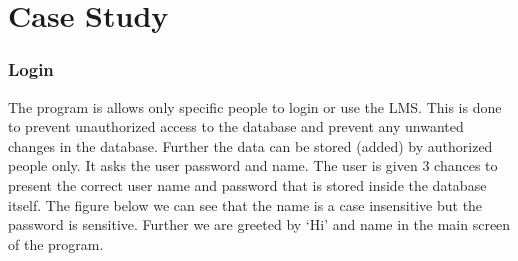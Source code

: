 \documentclass[12pt, a4paper, titlepage, openany]{report}
\begin{document}
\part{Case Study}
\section{Login}
The program is allows only specific people to login or use the LMS. This is done to prevent unauthorized access to the database and prevent any unwanted changes in the database. Further the data can be stored (added) by authorized people only. It asks the user password and name. The user is given 3 chances to present the correct user name and password that is stored inside the database itself. The figure below we can see that the name is a case insensitive but the password is sensitive. Further we are greeted by `Hi' and name in the main screen of the program. \par
{}
\end{document}
